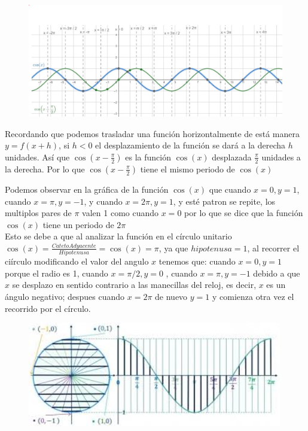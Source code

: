 \documentclass[12pt, letterpaper]{article}
\begin{document}
\begin{figure}[ht]
\centering
\includegraphics[width=40em]{t7dos}
\end{figure}

Recordando que podemos trasladar una función horizontalmente de está manera $y = f(x+h)$, si $h < 0$ el desplazamiento de la función se dará a la derecha $h$ unidades. Así que $\cos (x - \frac{\pi}{2})$ es la función $\cos (x)$ desplazada $\frac{\pi}{2}$ unidades  a la derecha. Por lo que  $\cos (x - \frac{\pi}{2})$ tiene el mismo periodo de $\cos (x)$

Podemos observar en la gráfica de la función $\cos(x)$ que cuando $x = 0, y = 1$, cuando $x=\pi, y= -1$, y cuando $x = 2\pi, y=1$, y esté patron se repite, los multiplos pares de $\pi$ valen 1 como cuando $x = 0$ por lo que se dice que la función $\cos (x)$ tiene un periodo de $2\pi$\\

Esto se debe a que al analizar la función en el círculo unitario $\cos (x) = \frac{CatetoAdyacente}{Hipotenusa} = \cos(x) = \pi$, ya que  $hipotenusa=1$, al recorrer el ciírculo modificando el valor del angulo $x$ tenemos que: cuando $x = 0, y=1$ porque el radio es 1,  cuando $x = \pi / 2, y = 0$ ,  cuando $x = \pi, y = -1$ debido a que $x$ se desplazo en sentido contrario a las manecillas del reloj, es decir, $x$ es un ángulo negativo; despues cuando $x=2\pi$ de nuevo $y=1$ y comienza otra vez el recorrido por el círculo.
\begin{figure}[ht]
\centering
\includegraphics[width=30em]{t7tres}
\end{figure}
\end{document}
